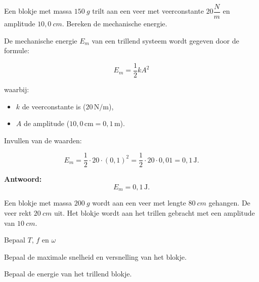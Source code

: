 \documentclass{ximera}
\begin{document}

\begin{exercise} 
    Een blokje met massa $150 \ g$ trilt aan een veer met veerconstante $20 \dfrac{N}{m}$ en amplitude $10,0 \ cm$. 
    Bereken de mechanische energie.
    \begin{solution}


De mechanische energie \( E_m \) van een trillend systeem wordt gegeven door de formule:

\[
E_m = \frac{1}{2} k A^2
\]

waarbij:
\begin{itemize}
    \item \( k \) de veerconstante is (\( 20 \, \text{N/m} \)),
    \item \( A \) de amplitude (\( 10,0 \, \text{cm} = 0,1 \, \text{m} \)).
\end{itemize}

Invullen van de waarden:

\[
E_m = \frac{1}{2} \cdot 20 \cdot (0,1)^2 = \frac{1}{2} \cdot 20 \cdot 0,01 = 0,1 \, \text{J}.
\]

\textbf{Antwoord:}
\[
E_m = 0,1 \, \text{J}.
\]
    \end{solution}
\end{exercise}

\begin{exercise} 
    Een blokje met massa $200 \ g$ wordt aan een veer met lengte $80 \ cm$ gehangen. De veer rekt $20 \ cm$ uit. 
    Het blokje wordt aan het trillen gebracht met een amplitude van $10 \ cm$.
        \begin{question}
	   Bepaal $T$, $f$ en $\omega$
        \end{question}

        \begin{question}
        Bepaal de maximale snelheid en versnelling van het blokje. 
        \end{question}

        \begin{question}
          Bepaal de energie van het trillend blokje.  
        \end{question}
\end{exercise}
\end{document}
